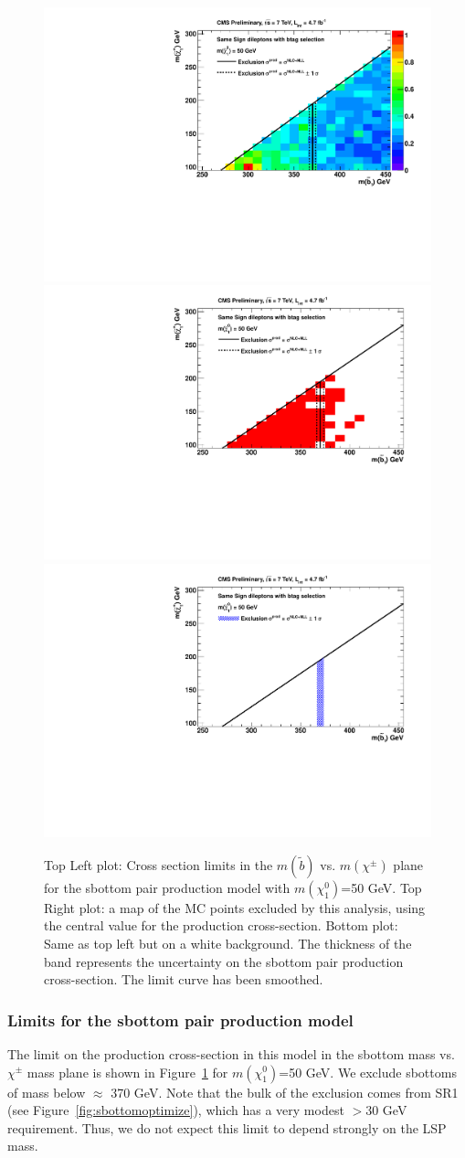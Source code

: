\begin{figure}[htb]
\begin{center}
\includegraphics[width=0.48\linewidth]{figs/B1_LimitsOnCarpet.pdf}
\includegraphics[width=0.48\linewidth]{figs/B1_ExcludedRegionMap.pdf}
\includegraphics[width=0.48\linewidth]{figs/B1_LimitsOnWhite.pdf}
\caption{Top Left plot: Cross section limits in the $m(\widetilde{b})$ vs. $m(\chi^{\pm})$ 
plane for the sbottom pair production model with 
$m(\chi^0_1)$=50 GeV.  Top Right plot: a map of the MC points excluded by this
analysis, using the central value for the production cross-section.  Bottom plot:  Same as top left
but on a white background.  The thickness of the band represents the uncertainty on the sbottom pair production cross-section.
The limit curve has been smoothed.
\label{fig:sbottomLimit}}
\end{center}
\end{figure}





\subsubsection{Limits for the sbottom pair production model}
\label{sec:sbottompairlimits}
The limit on the production cross-section in this model in the 
sbottom mass vs. $\chi^{\pm}$ mass plane is shown in 
Figure~\ref{fig:sbottomLimit} for 
$m(\chi^0_1)$=50 GeV. We exclude sbottoms of mass below $\approx$ 
370 GeV.  Note that the bulk of the exclusion comes 
from SR1 (see Figure~\ref{fig:sbottomoptimize}), which
has a very modest \met $> 30$ GeV requirement.  Thus, we do not
expect this limit to depend strongly on the LSP mass.


